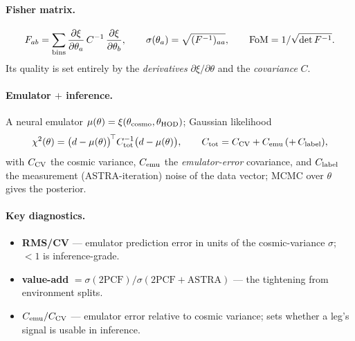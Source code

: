 \documentclass[11pt]{article}
\newcommand{\Cemu}{C_{\rm emu}}
\newcommand{\Ccv}{C_{\rm CV}}
\begin{document}
\paragraph{Fisher matrix.}
\[
F_{ab}=\sum_{\rm bins}\frac{\partial\xi}{\partial\theta_a}\,C^{-1}\,
\frac{\partial\xi}{\partial\theta_b},\qquad
\sigma(\theta_a)=\sqrt{(F^{-1})_{aa}},\qquad
\mathrm{FoM}=1/\sqrt{\det F^{-1}} .
\]
Its quality is set entirely by the \emph{derivatives} $\partial\xi/\partial\theta$ and
the \emph{covariance} $C$.

\paragraph{Emulator $+$ inference.} A neural emulator $\mu(\theta)=\xi(\theta_{\rm
cosmo},\theta_{\rm HOD})$; Gaussian likelihood
\[
\chi^2(\theta)=\big(d-\mu(\theta)\big)^{\!\top} C_{\rm tot}^{-1}\big(d-\mu(\theta)\big),
\qquad C_{\rm tot}=\Ccv+\Cemu\,(+\,C_{\rm label}),
\]
with $\Ccv$ the cosmic variance, $\Cemu$ the \emph{emulator-error} covariance, and
$C_{\rm label}$ the measurement (ASTRA-iteration) noise of the data vector; MCMC over
$\theta$ gives the posterior.

\paragraph{Key diagnostics.}
\begin{itemize}
\item \textbf{RMS/CV} --- emulator prediction error in units of the cosmic-variance
  $\sigma$; $<1$ is inference-grade.
\item \textbf{value-add} $=\sigma(\text{2PCF})/\sigma(\text{2PCF}+\text{ASTRA})$ --- the
  tightening from environment splits.
\item $\Cemu/\Ccv$ --- emulator error relative to cosmic variance; sets whether a leg's
  signal is usable in inference.
\end{itemize}
\end{document}
